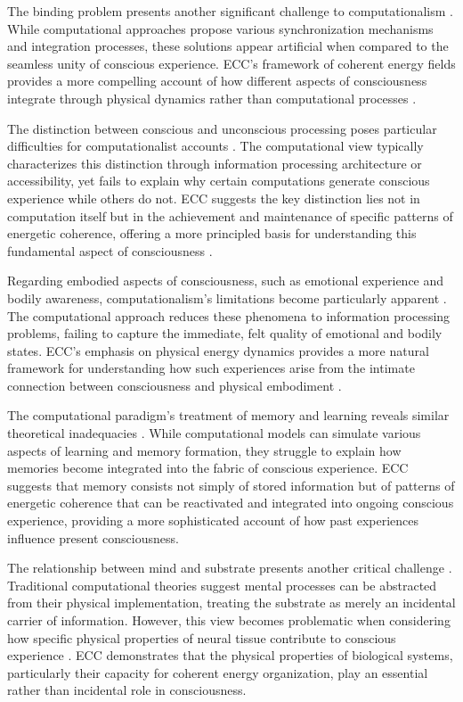 \begin{refsection}
The binding problem presents another significant challenge to computationalism \cite{maturana1980autopoiesis}. While computational approaches propose various synchronization mechanisms and integration processes, these solutions appear artificial when compared to the seamless unity of conscious experience. ECC's framework of coherent energy fields provides a more compelling account of how different aspects of consciousness integrate through physical dynamics rather than computational processes \cite{bickhard1995foundational}.

The distinction between conscious and unconscious processing poses particular difficulties for computationalist accounts \cite{fodor2000mind}. The computational view typically characterizes this distinction through information processing architecture or accessibility, yet fails to explain why certain computations generate conscious experience while others do not. ECC suggests the key distinction lies not in computation itself but in the achievement and maintenance of specific patterns of energetic coherence, offering a more principled basis for understanding this fundamental aspect of consciousness \cite{dreyfus1972what}.

Regarding embodied aspects of consciousness, such as emotional experience and bodily awareness, computationalism's limitations become particularly apparent \cite{smith2019promise}. The computational approach reduces these phenomena to information processing problems, failing to capture the immediate, felt quality of emotional and bodily states. ECC's emphasis on physical energy dynamics provides a more natural framework for understanding how such experiences arise from the intimate connection between consciousness and physical embodiment \cite{piccinini2015physical}.

The computational paradigm's treatment of memory and learning reveals similar theoretical inadequacies \cite{harnad1990symbol}. While computational models can simulate various aspects of learning and memory formation, they struggle to explain how memories become integrated into the fabric of conscious experience. ECC suggests that memory consists not simply of stored information but of patterns of energetic coherence that can be reactivated and integrated into ongoing conscious experience, providing a more sophisticated account of how past experiences influence present consciousness.

The relationship between mind and substrate presents another critical challenge \cite{dreyfus1972what}. Traditional computational theories suggest mental processes can be abstracted from their physical implementation, treating the substrate as merely an incidental carrier of information. However, this view becomes problematic when considering how specific physical properties of neural tissue contribute to conscious experience \cite{searle1980minds}. ECC demonstrates that the physical properties of biological systems, particularly their capacity for coherent energy organization, play an essential rather than incidental role in consciousness.


\end{refsection}
